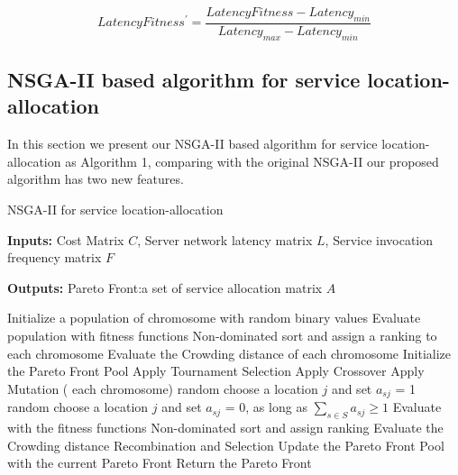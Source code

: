 \documentclass{llncs}
\begin{document}
\begin{flushleft}
\begin{flushleft}
	\begin{equation}
		\label{eq:latency_prime}
		LatencyFitness^\prime = \frac{LatencyFitness - Latency_{min}}{Latency_{max} - Latency_{min}}
	\end{equation}


\subsection{NSGA-II based algorithm for service location-allocation}
In this section we present our NSGA-II based algorithm for service location-allocation as Algorithm 1,
comparing with the original NSGA-II our  proposed algorithm has two new features.
\begin{algorithm}[htb]
	\caption{NSGA-II for service location-allocation}
	\label{NSGA2}
	\textbf{Inputs:}
		Cost Matrix $C$,
		Server network latency matrix $L$, 
		Service invocation frequency matrix $F$

	\textbf{Outputs:}
		Pareto Front:a  set of service allocation matrix $A$

	\begin{algorithmic}[1]
		\label{alg:1}
		\State Initialize a population of chromosome with random binary values
		\State Evaluate population with fitness functions
		\State Non-dominated sort and assign a ranking to each chromosome
		\State Evaluate the Crowding distance of each chromosome
		\State Initialize the Pareto Front Pool
		\State Apply Tournament Selection
		\State Apply Crossover 
		\State Apply Mutation
		\For( each chromosome)
		\State random choose a location $j$ and set $a_{sj}$ = 1
		\EndWhile
		\State random choose a location $j$ and set $a_{sj}$ = 0, as long as $\sum\limits_{s \in S} a_{sj} \geq 1$
		\EndWhile
		\State Evaluate with the fitness functions
		\EndIf
		\EndFor
		\State Non-dominated sort and assign ranking
		\State Evaluate the Crowding distance
		\State Recombination and Selection
		\State Update the Pareto Front Pool with the current Pareto Front
		\EndWhile
		\State Return the Pareto Front
	\end{algorithmic}
\end{algorithm}


\end{flushleft}
\end{flushleft}
\end{document}
